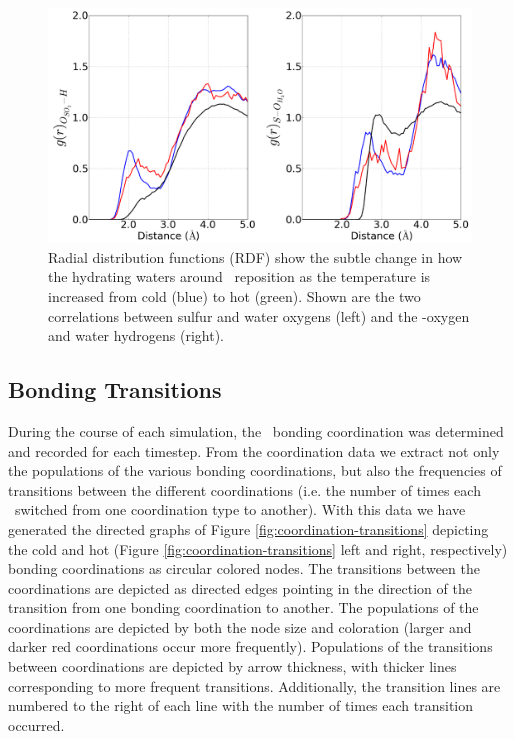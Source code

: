 \documentclass{article}
\begin{document}
\begin{figure}[h!]
	\begin{center}
		\includegraphics[scale=1.0]{rdf-small.png}
		\caption{Radial distribution functions (RDF) show the subtle change in how the hydrating waters around \suldiox~reposition as the temperature is increased from cold (blue) to hot (green). Shown are the two correlations between sulfur and water oxygens (left) and the \suldiox-oxygen and water hydrogens (right).}
		\label{fig:rdf}
	\end{center}
\end{figure}

\subsection {Bonding Transitions}

During the course of each simulation, the \suldiox~bonding coordination was determined and recorded for each timestep. From the coordination data we extract not only the populations of the various bonding coordinations, but also the frequencies of transitions between the different coordinations (i.e. the number of times each \suldiox~switched from one coordination type to another). With this data we have generated the directed graphs of Figure \ref{fig:coordination-transitions} depicting the cold and hot (Figure \ref{fig:coordination-transitions} left and right, respectively) bonding coordinations as circular colored nodes.\cite{Ellson2004,Gansner1999} The transitions between the coordinations are depicted as directed edges pointing in the direction of the transition from one bonding coordination to another. The populations of the coordinations are depicted by both the node size and coloration (larger and darker red coordinations occur more frequently). Populations of the transitions between coordinations are depicted by arrow thickness, with thicker lines corresponding to more frequent transitions. Additionally, the transition lines are numbered to the right of each line with the number of times each transition occurred. 
\end{document}
